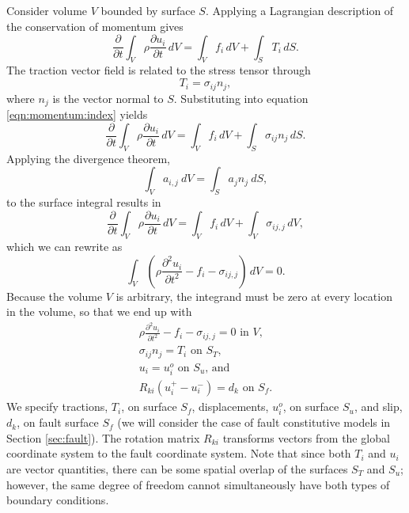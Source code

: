Consider volume $V$ bounded by surface $S$. Applying a Lagrangian
description of the conservation of momentum gives
\begin{equation}
\label{eqn:momentum:index}
\frac{\partial}{\partial t}\int_{V}\rho\frac{\partial u_{i}}{\partial t}\, dV=\int_{V}f_{i}\, dV+\int_{S}T_{i}\, dS.
\end{equation}
The traction vector field is related to the stress tensor through
\begin{equation}
T_{i}=\sigma_{ij}n_{j},
\end{equation}
where $n_{j}$ is the vector normal to $S$. Substituting into equation
\vref{eqn:momentum:index} yields
\begin{equation}
\frac{\partial}{\partial t}\int_{V}\rho\frac{\partial u_{i}}{\partial t}\, dV=\int_{V}f_{i}\, dV+\int_{S}\sigma_{ij}n_{j}\, dS.
\end{equation}
Applying the divergence theorem,
\begin{equation}
\int_{V}a_{i,j}\: dV=\int_{S}a_{j}n_{j}\: dS,
\end{equation}
to the surface integral results in
\begin{equation}
\frac{\partial}{\partial t}\int_{V}\rho\frac{\partial u_{i}}{\partial t}\, dV=\int_{V}f_{i}\, dV+\int_{V}\sigma_{ij,j}\, dV,
\end{equation}
which we can rewrite as
\begin{equation}
\int_{V}\left(\rho\frac{\partial^{2}u_{i}}{\partial t^{2}}-f_{i}-\sigma_{ij,j}\right)\, dV=0.
\end{equation}
Because the volume $V$ is arbitrary, the integrand must be zero at
every location in the volume, so that we end up with
\begin{gather}
\rho\frac{\partial^{2}u_{i}}{\partial t^{2}}-f_{i}-\sigma_{ij,j}=0\text{ in }V,\\
\sigma_{ij}n_{j}=T_{i}\text{ on }S_{T}\text{,}\\
u_{i}=u_{i}^{o}\text{ on }S_{u}\text{, and}\\
R_{ki}(u_{i}^{+}-u_{i}^{-})=d_{k}\text{ on }S_{f}.
\end{gather}
We specify tractions, $T_{i}$, on surface $S_{f}$, displacements,
$u_{i}^{o}$, on surface $S_{u}$, and slip, $d_{k}$, on fault surface
$S_{f}$ (we will consider the case of fault constitutive models in
Section \vref{sec:fault}). The rotation matrix $R_{ki}$ transforms
vectors from the global coordinate system to the fault coordinate
system. Note that since both $T_{i}$ and $u_{i}$ are vector quantities,
there can be some spatial overlap of the surfaces $S_{T}$ and $S_{u}$;
however, the same degree of freedom cannot simultaneously have both
types of boundary conditions.


